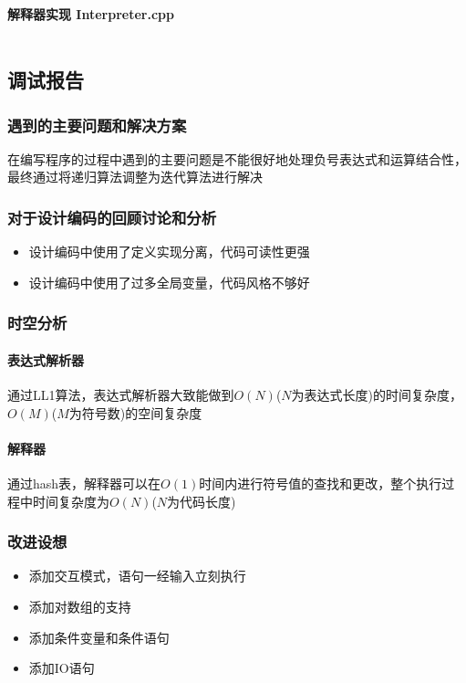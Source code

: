 \documentclass[UTF8]{ctexart}
\begin{document}
        \paragraph{解释器实现 Interpreter.cpp}
        \inputminted{cpp}{../src/Interpreter/Interpreter.cpp}
    \subsection{调试报告}
      \subsubsection{遇到的主要问题和解决方案}
      在编写程序的过程中遇到的主要问题是不能很好地处理负号表达式和运算结合性，最终通过将递归算法调整为迭代算法进行解决
      \subsubsection{对于设计编码的回顾讨论和分析}
      \begin{itemize}
        \item 设计编码中使用了定义实现分离，代码可读性更强
        \item 设计编码中使用了过多全局变量，代码风格不够好
      \end{itemize}
      \subsubsection{时空分析}
      \paragraph{表达式解析器}
        通过LL1算法，表达式解析器大致能做到$O(N)$($N$为表达式长度)的时间复杂度，$O(M)$($M$为符号数)的空间复杂度
      \paragraph{解释器}
        通过hash表，解释器可以在$O(1)$时间内进行符号值的查找和更改，整个执行过程中时间复杂度为$O(N)$($N$为代码长度)
      \subsubsection{改进设想}
      \begin{itemize}
        \item 添加交互模式，语句一经输入立刻执行
        \item 添加对数组的支持
        \item 添加条件变量和条件语句
        \item 添加IO语句
      \end{itemize}
\end{document}
